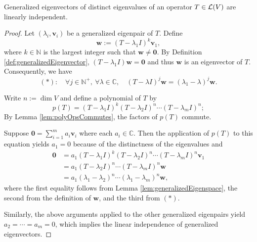 \begin{lem}
  \label{lem:generalizedEigenvecsLinearIndep}
  Generalized eigenvectors of distinct eigenvalues
  of an operator $T\in {\cal L}(V)$
  are linearly independent.
\end{lem}
\begin{proof}
  Let $(\lambda_i,\mathbf{v}_i)$ be
  a generalized eigenpair of $T$.
  Define
  \begin{displaymath}
    \mathbf{w} := (T-\lambda_1I)^k\mathbf{v}_1,
  \end{displaymath}
  where $k\in \mathbb{N}$ is the largest integer
  such that $\mathbf{w}\ne \mathbf{0}$.
  By Definition \ref{def:generalizedEigenvector},
  $(T-\lambda_1I)\mathbf{w}=\mathbf{0}$
  and thus $\mathbf{w}$ is an eigenvector of $T$.
  Consequently, we have
  \begin{displaymath}
    (*):\quad \forall j\in \mathbb{N}^+,\ \forall \lambda\in \mathbb{C},\quad
    (T-\lambda I)^j \mathbf{w} = (\lambda_1-\lambda)^j \mathbf{w}.
  \end{displaymath}
  
  Write $n:=\dim V$ and define a polynomial of $T$ by
  \begin{displaymath}
    p(T) = (T-\lambda_1 I)^k(T-\lambda_2I)^n\cdots(T-\lambda_mI)^n; 
  \end{displaymath}
  By Lemma \ref{lem:polyOpsCommutes}, the factors of $p(T)$ commute.
  
  Suppose $\mathbf{0} = \sum_{i=1}^m a_i \mathbf{v}_i$
  where each $a_i\in \mathbb{C}$.
  Then the application of $p(T)$ to this equation yields $a_1=0$
  because of the distinctness of the eigenvalues and
  \begin{displaymath}
    \begin{array}{rl}
    \mathbf{0} &= a_1(T-\lambda_1 I)^k(T-\lambda_2I)^n\cdots(T-\lambda_mI)^n\mathbf{v}_1\\
      &= a_1(T-\lambda_2I)^n\cdots(T-\lambda_mI)^n\mathbf{w}\\
      &= a_1(\lambda_1-\lambda_2)^n\cdots(\lambda_1-\lambda_m)^n \mathbf{w},
    \end{array}
  \end{displaymath}
  where the first equality follows from Lemma \ref{lem:generalizedEigenspace}, 
  the second from the definition of $\mathbf{w}$, 
  and the third from $(*)$.
  
  Similarly,
  the above arguments applied to
  the other generalized eigenpairs
  yield $a_2=\cdots=a_m=0$,
  which implies the linear independence of generalized eigenvectors.
\end{proof}

